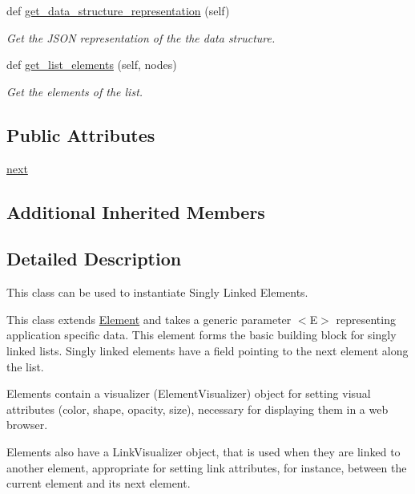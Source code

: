 \begin{DoxyCompactItemize}
\item 
def \mbox{\hyperlink{class_bridges_1_1_s_lelement_1_1_s_lelement_ad0f794bc7d3acfb9e6b078e6c1d6d91d}{get\+\_\+data\+\_\+structure\+\_\+representation}} (self)
\begin{DoxyCompactList}\small\item\em Get the J\+S\+ON representation of the the data structure. \end{DoxyCompactList}\item 
def \mbox{\hyperlink{class_bridges_1_1_s_lelement_1_1_s_lelement_a74cc9e951eb6a869534de13d46e46010}{get\+\_\+list\+\_\+elements}} (self, nodes)
\begin{DoxyCompactList}\small\item\em Get the elements of the list. \end{DoxyCompactList}\end{DoxyCompactItemize}
\subsection*{Public Attributes}
\begin{DoxyCompactItemize}
\item 
\mbox{\hyperlink{class_bridges_1_1_s_lelement_1_1_s_lelement_a650935f5a68b49de4c222cc4c8b0c778}{next}}
\end{DoxyCompactItemize}
\subsection*{Additional Inherited Members}


\subsection{Detailed Description}
This class can be used to instantiate Singly Linked Elements. 

This class extends \mbox{\hyperlink{namespace_bridges_1_1_element}{Element}} and takes a generic parameter $<$\+E$>$ representing application specific data. This element forms the basic building block for singly linked lists. Singly linked elements have a field pointing to the next element along the list.

\begin{DoxyVerb}Elements contain a visualizer (ElementVisualizer) object for setting visual
attributes (color, shape, opacity, size), necessary for displaying them in a
web browser.

Elements also have a LinkVisualizer object, that is used when they are linked to
another element, appropriate for setting link attributes, for instance, between
the current element and its next element.
\end{DoxyVerb}



